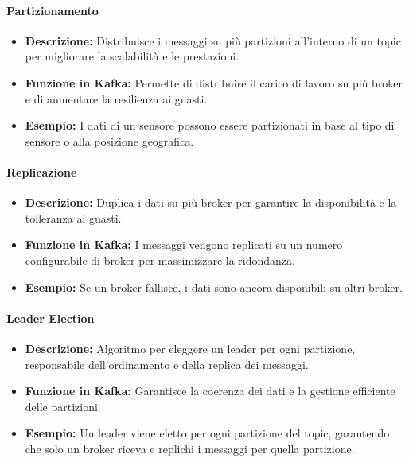 \paragraph{Partizionamento}
\begin{itemize}
    \item \textbf{Descrizione:} Distribuisce i messaggi su più partizioni all'interno di un topic per migliorare la scalabilità e le prestazioni.
    \item \textbf{Funzione in Kafka:} Permette di distribuire il carico di lavoro su più broker e di aumentare la resilienza ai guasti.
    \item \textbf{Esempio:} I dati di un sensore possono essere partizionati in base al tipo di sensore o alla posizione geografica.
\end{itemize}

\paragraph{Replicazione}
\begin{itemize}
    \item \textbf{Descrizione:} Duplica i dati su più broker per garantire la disponibilità e la tolleranza ai guasti.
    \item \textbf{Funzione in Kafka:} I messaggi vengono replicati su un numero configurabile di broker per massimizzare la ridondanza.
    \item \textbf{Esempio:} Se un broker fallisce, i dati sono ancora disponibili su altri broker.
\end{itemize}



\paragraph{Leader Election}
\begin{itemize}
    \item \textbf{Descrizione:} Algoritmo per eleggere un leader per ogni partizione, responsabile dell'ordinamento e della replica dei messaggi.
    \item \textbf{Funzione in Kafka:} Garantisce la coerenza dei dati e la gestione efficiente delle partizioni.
    \item \textbf{Esempio:} Un leader viene eletto per ogni partizione del topic, garantendo che solo un broker riceva e replichi i messaggi per quella partizione.
\end{itemize}


